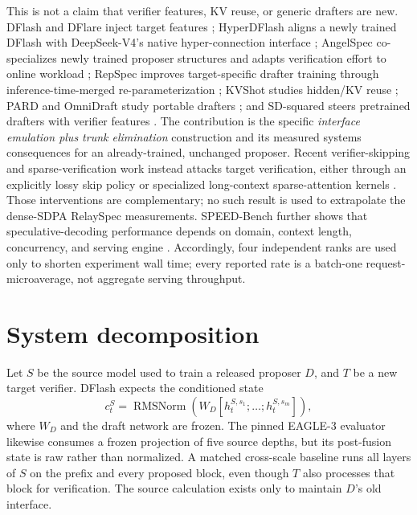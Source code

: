 \documentclass[10pt]{article}
\begin{document}
This is not a claim that verifier features, KV reuse, or generic drafters are
new. DFlash and DFlare inject target features \cite{chen2026dflash,zhang2026dflare};
HyperDFlash aligns a newly trained DFlash with DeepSeek-V4's native
hyper-connection interface \cite{lin2026hyperdflash};
AngelSpec co-specializes newly trained proposer structures and adapts
verification effort to online workload \cite{liu2026angelspec};
RepSpec improves target-specific drafter training through inference-time-merged
re-parameterization \cite{huo2026repspec};
KVShot studies hidden/KV reuse \cite{liu2026kvshot}; PARD and OmniDraft study
portable drafters \cite{an2026pard,ramakrishnan2025omnidraft}; and
SD-squared steers pretrained drafters with verifier features
\cite{berdoz2026sd2}. The contribution is the specific \emph{interface
emulation plus trunk elimination} construction and its measured systems
consequences for an already-trained, unchanged proposer.
Recent verifier-skipping and sparse-verification work instead attacks target
verification, either through an explicitly lossy skip policy or specialized
long-context sparse-attention kernels \cite{luo2026verifierskipping,wang2026specsa}.
Those interventions are complementary; no such result is used to extrapolate
the dense-SDPA RelaySpec measurements.
SPEED-Bench further shows that speculative-decoding performance depends on
domain, context length, concurrency, and serving engine
\cite{abramovich2026speedbench}. Accordingly, four independent ranks are used
only to shorten experiment wall time; every reported rate is a batch-one
request-microaverage, not aggregate serving throughput.

\section{System decomposition}

Let $S$ be the source model used to train a released proposer $D$, and $T$
be a new target verifier. DFlash expects the conditioned state
\begin{equation}
c_t^S = \operatorname{RMSNorm}\!\left(
W_D [h_t^{S,s_1};\ldots;h_t^{S,s_m}]\right),
\end{equation}
where $W_D$ and the draft network are frozen. The pinned EAGLE-3 evaluator
likewise consumes a frozen projection of five source depths, but its
post-fusion state is raw rather than normalized. A matched cross-scale baseline
runs all layers of $S$ on the prefix and every proposed block, even though $T$
also processes that block for verification. The source calculation exists
only to maintain $D$'s old interface.
\end{document}

